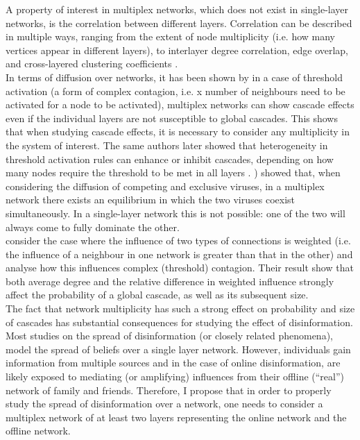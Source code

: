 \documentclass[10pt,a4paper]{article}
\begin{document}
A property of interest in multiplex networks, which does not exist in single-layer networks, is the correlation between different layers. Correlation can be described in multiple ways, ranging from the extent of node multiplicity (i.e. how many vertices appear in different layers), to interlayer degree correlation, edge overlap, and cross-layered clustering coefficients \citep{Lee2015}. \\

In terms of diffusion over networks, it has been shown by \cite{Brummitt2012} in a case of threshold activation (a form of complex contagion, i.e. x number of neighbours need to be activated for a node to be activated), multiplex networks can show cascade effects even if the individual layers are not susceptible to global cascades. This shows that when studying cascade effects, it is necessary to consider any multiplicity in the system of interest. The same authors later showed that heterogeneity in threshold activation rules can enhance or inhibit cascades, depending on how many nodes require the threshold to be met in all layers \citep{Lee2014}. \cite{Sahneh2014}) showed that, when considering the diffusion of competing and exclusive viruses, in a multiplex network there exists an equilibrium in which the two viruses coexist simultaneously. In a single-layer network this is not possible: one of the two will always come to fully dominate the other. \\

\cite{Yagan2012} consider the case where the influence of two types of connections is weighted (i.e. the influence of a neighbour in one network is greater than that in the other) and analyse how this influences complex (threshold) contagion.  Their result show that both average degree and the relative difference in weighted influence strongly affect the probability of a global cascade, as well as its subsequent size. \\

The fact that network multiplicity has such a strong effect on probability and size of cascades has substantial consequences for studying the effect of disinformation. Most studies on the spread of disinformation (or closely related phenomena), model the spread of beliefs over a single layer network. However, individuals gain information from multiple sources and in the case of online disinformation, are likely exposed to mediating (or amplifying) influences from their offline (“real”) network of family and friends. Therefore, I propose that in order to properly study the spread of disinformation over a network, one needs to consider a multiplex network of at least two layers representing the online network and the offline network. 
\end{document}

